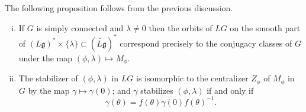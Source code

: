 \documentclass[12pt]{article}
\begin{document}
The following proposition follows from the previous discussion.
\begin{proposition}
    \begin{enumerate}[(i)]
        \item If $G$ is simply connected and $\lambda \neq 0$ then the orbits of $LG$
              on the smooth part of $(L\mathfrak{g})^* \times \{\lambda\} \subset (\widetilde{L\mathfrak{g}})^*$
              correspond precisely to the conjugacy classes of $G$ under the map
              $(\phi,\lambda) \mapsto M_\phi$.
        \item The stabilizer of $(\phi,\lambda)$ in $LG$ is isomorphic to the centralizer
              $Z_\phi$ of $M_\phi$ in $G$ by the map $\gamma \mapsto \gamma(0)$; and
              $\gamma$ stabilizes $(\phi,\lambda)$ if and only if
              \[
                  \gamma(\theta) = f(\theta)\gamma(0)f(\theta)^{-1}.
              \]
    \end{enumerate}
\end{proposition}
\end{document}

